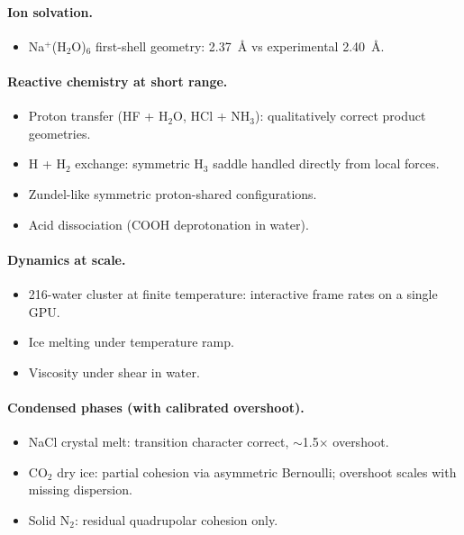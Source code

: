 \paragraph{Ion solvation.}
\begin{itemize}
\item Na$^+$(H$_2$O)$_6$ first-shell geometry: 2.37~\AA{} vs experimental 2.40~\AA.
\end{itemize}

\paragraph{Reactive chemistry at short range.}
\begin{itemize}
\item Proton transfer (HF + H$_2$O, HCl + NH$_3$): qualitatively correct product geometries.
\item H + H$_2$ exchange: symmetric H$_3$ saddle handled directly from local forces.
\item Zundel-like symmetric proton-shared configurations.
\item Acid dissociation (COOH deprotonation in water).
\end{itemize}

\paragraph{Dynamics at scale.}
\begin{itemize}
\item 216-water cluster at finite temperature: interactive frame rates on a single GPU.
\item Ice melting under temperature ramp.
\item Viscosity under shear in water.
\end{itemize}

\paragraph{Condensed phases (with calibrated overshoot).}
\begin{itemize}
\item NaCl crystal melt: transition character correct, $\sim$1.5$\times$ overshoot.
\item CO$_2$ dry ice: partial cohesion via asymmetric Bernoulli; overshoot scales with missing dispersion.
\item Solid N$_2$: residual quadrupolar cohesion only.
\end{itemize}

